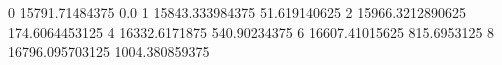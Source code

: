 0 15791.71484375 0.0
1 15843.333984375 51.619140625
2 15966.3212890625 174.6064453125
4 16332.6171875 540.90234375
6 16607.41015625 815.6953125
8 16796.095703125 1004.380859375
